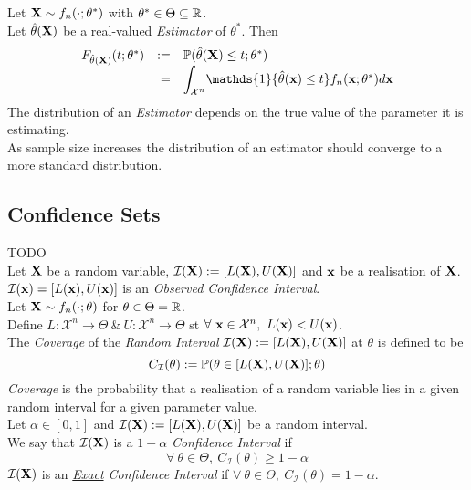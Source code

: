 \documentclass[11pt,a4paper]{article}
\begin{document}
Let $\textbf{X}\sim f_n(\cdot;\theta^*)$ with $\theta^*\in\Theta\subseteq\mathbb{R}$.\\
Let $\hat\theta(\textbf{X})$ be a real-valued \textit{Estimator} of $\theta^*$. Then
\[\begin{array}{rrl}
F_{\hat\theta(\X)}(t;\theta^*)&:=&\prob(\hat\theta(\X)\leq t;\theta^*)\\
&=&{\displaystyle\int_{\mathcal{X}^n}}\mathds{1}\{\hat\theta(\x)\leq t\}f_n(\x;\theta^*)d\x
\end{array}\]
\nb The distribution of an \textit{Estimator} depends on the true value of the parameter it is estimating.\\
\nb As sample size increases the distribution of an estimator should converge to a more standard distribution.

\subsection{Confidence Sets}

TODO\\

Let $\textbf{X}$ be a random variable, $\mathcal{I}(\textbf{X}):=[L(\textbf{X}),U(\textbf{X})]$ and $\textbf{x}$ be a realisation of $\textbf{X}$.\\
$\mathcal{I}(\textbf{x})=[L(\textbf{x}),U(\textbf{x})]$ is an \textit{Observed Confidence Interval}.\\

Let $\textbf{X}\sim f_n(\cdot;\theta)$ for $\theta\in\Theta=\mathbb{R}$.\\
Define $L:\mathcal{X}^n\to\Theta\ \&\ U:\mathcal{X}^n\to\Theta$ st $\forall\ \x\in\mathcal{X}^n,\ L(\x)<U(\x)$.\\
The \textit{Coverage} of the \textit{Random Interval} $\mathcal{I}(\textbf{X}):=[L(\textbf{X}),U(\textbf{X})]$ at $\theta$ is defined to be
$$C_\mathcal{I}(\theta):=\mathbb{P}(\theta\in[L(\textbf{X}),U(\textbf{X})];\theta)$$
\nb \textit{Coverage} is the probability that a realisation of a random variable lies in a given random interval for a given parameter value.\\

Let $\alpha\in[0,1]$ and $\mathcal{I}(\textbf{X}):=[L(\textbf{X}),U(\textbf{X})]$ be a random interval.\\
We say that $\mathcal{I}(\textbf{X})$ is a $1-\alpha$ \textit{Confidence Interval} if
$$\forall\ \theta\in\Theta,\ C_\mathcal{I}(\theta)\geq1-\alpha$$
\nb $\mathcal{I}(\textbf{X})$ is an \textit{\underline{Exact} Confidence Interval} if $\forall\ \theta\in\Theta,\ C_\mathcal{I}(\theta)=1-\alpha$.\\
\end{document}
